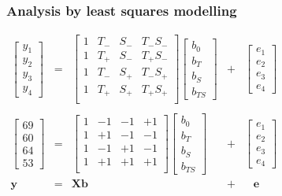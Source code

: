 \begin{frame}\frametitle{Analysis by least squares modelling}

	$
	\begin{array}{rcccl}
		\begin{bmatrix}
			y_1\\
			y_2\\
			y_3 \\
			y_4
		\end{bmatrix}
		&=&
		\begin{bmatrix}
			1 & T_{-} & S_{-} & T_{-}S_{-}\\
			1 & T_{+} & S_{-} & T_{+}S_{-}\\
			1 & T_{-} & S_{+} & T_{-}S_{+}\\
			1 & T_{+} & S_{+} & T_{+}S_{+}\\
		\end{bmatrix}
		\begin{bmatrix}
			b_0 \\
			b_T \\
			b_S \\
			b_{TS}
		\end{bmatrix}
		&+&
		\begin{bmatrix}
			e_1\\
			e_2\\
			e_3 \\
			e_4
		\end{bmatrix}
		\\
		\\
		\begin{bmatrix}
			69\\
			60\\
			64\\
			53
		\end{bmatrix}
		&=&
		\begin{bmatrix}
			1 & -1 & -1 & +1\\
			1 & +1 & -1 & -1\\
			1 & -1 & +1 & -1\\
			1 & +1 & +1 & +1\\
		\end{bmatrix}
		\begin{bmatrix}
			b_0 \\
			b_T \\
			b_S \\
			b_{TS}
		\end{bmatrix}
		&+&
		\begin{bmatrix}
			e_1\\
			e_2\\
			e_3 \\
			e_4
		\end{bmatrix}
		\\
		\mathbf{y} &=& \mathbf{X} \mathbf{b} &+& \,\,\,\,\,\mathbf{e} \\
	\end{array}
	$
	

\end{frame}
